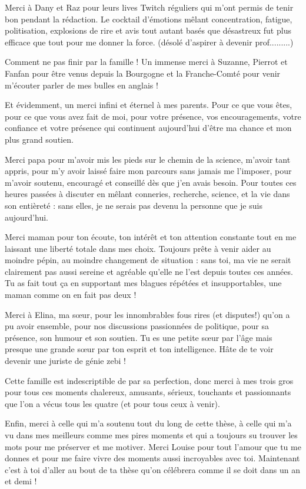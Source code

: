 \npar

Merci à Dany et Raz pour leurs lives Twitch réguliers qui m'ont permis de tenir bon pendant la rédaction. Le cocktail d'émotions mêlant concentration, fatigue, politisation, explosions de rire et avis tout autant basés que désastreux fut plus efficace que tout pour me donner la force. (désolé d'aspirer à devenir prof.........)

\npar

\npar

Comment ne pas finir par la famille ! Un immense merci à Suzanne, Pierrot et Fanfan pour être venus depuis la Bourgogne et la Franche-Comté pour venir m'écouter parler de mes bulles en anglais ! 

\npar

Et évidemment, un merci infini et éternel à mes parents. Pour ce que vous êtes, pour ce que vous avez fait de moi, pour votre présence, vos encouragements, votre confiance et votre présence qui continuent aujourd'hui d'être ma chance et mon plus grand soutien. 

Merci papa pour m'avoir mis les pieds sur le chemin de la science, m'avoir tant appris, pour m'y avoir laissé faire mon parcours sans jamais me l'imposer, pour m'avoir soutenu, encouragé et conseillé dès que j'en avais besoin. Pour toutes ces heures passées à discuter en mêlant conneries, recherche, science, et la vie dans son entièreté : sans elles, je ne serais pas devenu la personne que je suis aujourd'hui.

Merci maman pour ton écoute, ton intérêt et ton attention constante tout en me laissant une liberté totale dans mes choix. Toujours prête à venir aider au moindre pépin, au moindre changement de situation : sans toi, ma vie ne serait clairement pas aussi sereine et agréable qu'elle ne l'est depuis toutes ces années. Tu as fait tout ça en supportant mes blagues répétées et insupportables, une maman comme on en fait pas deux ! 

\npar

Merci à Elina, ma s\oe ur, pour les innombrables fous rires (et disputes!) qu'on a pu avoir ensemble, pour nos discussions passionnées de politique, pour sa présence, son humour et son soutien. Tu es une petite s\oe ur par l'âge mais presque une grande s\oe ur par ton esprit et ton intelligence. Hâte de te voir devenir une juriste de génie zebi ! 

\npar

Cette famille est indescriptible de par sa perfection, donc merci à mes trois gros pour tous ces moments chalereux, amusants, sérieux, touchants et passionnants que l'on a vécus tous les quatre (et pour tous ceux à venir).

\npar

\npar


Enfin, merci à celle qui m'a soutenu tout du long de cette thèse, à celle qui m'a vu dans mes meilleurs comme mes pires moments et qui a toujours su trouver les mots pour me préserver et me motiver. Merci Louise pour tout l'amour que tu me donnes et pour me faire vivre des moments aussi incroyables avec toi. Maintenant c'est à toi d'aller au bout de ta thèse qu'on célébrera comme il se doit dans un an et demi !
\endgroup